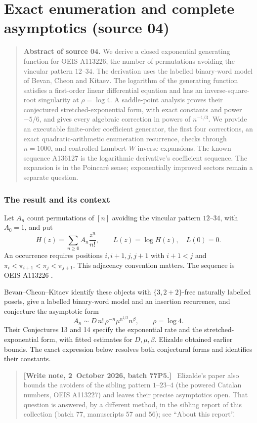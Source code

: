\documentclass[11pt]{article}
\theoremstyle{remark}\newtheorem{remark}[theorem]{Remark}
\newenvironment{writenote}{\begin{quote}\small\raggedright\textbf{[Write note, 2~October 2026, batch 77P5.]}\ }{\end{quote}}
\begin{document}
\part{Exact enumeration and complete asymptotics (source 04)}
\label{vav:part:one}
\begin{quote}\small
\textbf{Abstract of source 04.}
We derive a closed exponential generating function for OEIS A113226,
the number of permutations avoiding the vincular pattern $12$--$34$.
The derivation uses the labelled binary-word model of Bevan, Cheon and
Kitaev. The logarithm of the generating function satisfies a first-order
linear differential equation and has an inverse-square-root singularity
at $\rho=\log4$. A saddle-point analysis proves their conjectured
stretched-exponential form, with exact constants and power $-5/6$,
and gives every algebraic correction in powers of $n^{-1/3}$.
We provide an executable finite-order coefficient generator, the first
four corrections, an exact quadratic-arithmetic enumeration recurrence,
checks through $n=1000$, and controlled Lambert-$W$ inverse expansions.
The known sequence A136127 is the logarithmic derivative's coefficient
sequence. The expansion is in the Poincar\'e sense; exponentially
improved sectors remain a separate question.
\end{quote}

\section{The result and its context}\label{vav:sec:intro}

Let $A_n$ count permutations of $[n]$ avoiding the vincular pattern
$12$--$34$, with $A_0=1$, and put
\[
 H(z)=\sum_{n\ge0}A_n\frac{z^n}{n!},\qquad L(z)=\log H(z),\quad L(0)=0.
\]
An occurrence requires positions $i,i+1,j,j+1$ with $i+1<j$ and
$\pi_i<\pi_{i+1}<\pi_j<\pi_{j+1}$. This adjacency convention matters.
The sequence is OEIS A113226 \cite{oeis}.

Bevan--Cheon--Kitaev \cite{bck} identify these objects with
$\{3,2+2\}$-free naturally labelled posets, give a labelled binary-word
model and an insertion recurrence, and conjecture the asymptotic form
\[
 A_n\sim D\,n!\,\rho^{-n}\mu^{n^{1/3}}n^\beta,
 \qquad \rho=\log4.
\]
Their Conjectures 13 and 14 specify the exponential rate and the
stretched-exponential form, with fitted estimates for $D,\mu,\beta$.
Elizalde \cite{elizalde} obtained earlier bounds. The exact expression
below resolves both conjectural forms and identifies their constants.
\begin{writenote}
Elizalde's paper also bounds the avoiders of the sibling pattern
$1$--$23$--$4$ (the powered Catalan numbers, OEIS A113227) and leaves their
precise asymptotics open. That question is answered, by a different method,
in the sibling report
 of this
collection (batch 77, manuscripts 57 and 56); see ``About this report''.
\end{writenote}
\end{document}
